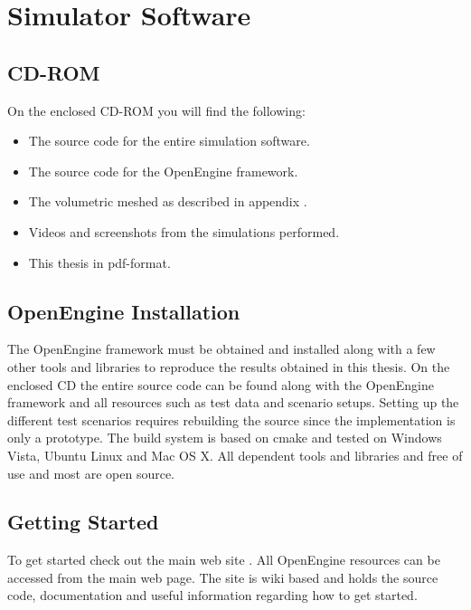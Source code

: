 
\chapter{Simulator Software}
\section{CD-ROM}
On the enclosed CD-ROM you will find the following:

\begin{itemize}
\item The source code for the entire simulation software.

\item The source code for the OpenEngine framework. 

\item The volumetric meshed as described in appendix
  .

\item Videos and screenshots from the simulations performed.

\item This thesis in pdf-format.
\end{itemize}

\section{OpenEngine Installation}
\label{sec:openengine_installation}
The OpenEngine framework
must be obtained and installed along with a few other tools and
libraries to reproduce the results obtained in this thesis. 
On the enclosed CD the entire
source code can be found along with the OpenEngine framework and all
resources such as test data and scenario setups.
%
Setting up the different test scenarios requires rebuilding the source
since the implementation is only a prototype. The build system
is based on cmake and tested on Windows Vista, Ubuntu Linux and Mac OS
X. All dependent tools and libraries and free of use and most are open
source.

\section{Getting Started}
To get started check out the main web site
. All OpenEngine resources
can be accessed from the main web page. The site is wiki based and
holds the source code, documentation and useful information regarding
how to get started.

